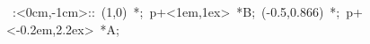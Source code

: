 
% 

\hbox{
\xy    <5cm,0cm>:<0cm,-1cm>::
       (1,0) *{\bullet}; p+<1em,1ex> *{B};
       (-0.5,0.866) *{\bullet}; p+<-0.2em,2.2ex> *{A};
\endxy}

